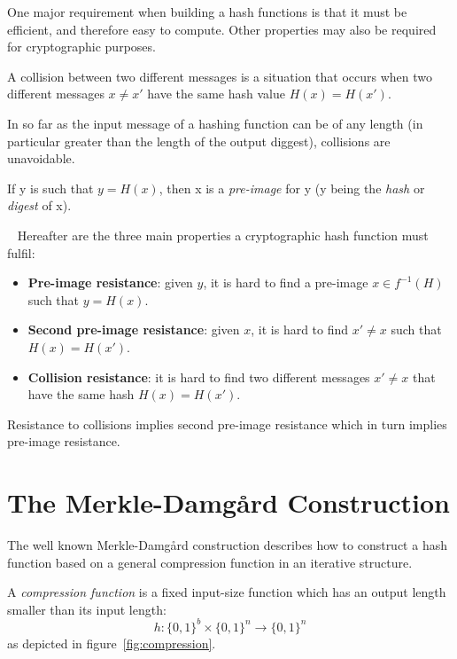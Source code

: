 One major requirement when building a hash functions is that it must be efficient, and therefore easy to compute. 
Other properties may also be required for cryptographic purposes.

\begin{defn}A collision between two different messages is a situation that occurs when two different messages $x \ne x'$ have the same hash value $H(x) = H(x')$.
\end{defn}
\begin{rem}
In so far as the input message of a hashing function can be of any length (in particular greater than the length of the output diggest), collisions are unavoidable.
\end{rem}
\begin{defn}
If y is such that $y = H(x)$, then x is a \emph{pre-image} for y (y being the \emph{hash} or \emph{digest}  of x).
\end{defn}

\begin{defn}~\label{def:sec_prop}
Hereafter are the three main properties a cryptographic hash function must fulfil:
\begin{itemize}
\item \textbf{Pre-image resistance}:  given $y$, it is hard to find a pre-image $x \in f^{-1}(H)$ such that $y = H(x)$.
\item \textbf{Second pre-image resistance}: given $x$, it is hard to find $x' \ne x$ such that $H(x) = H(x')$.
\item \textbf{Collision resistance}: it is hard to find two different messages $x' \ne x$ that have the same hash $H(x) = H(x')$.
\end{itemize}
\end{defn}

\begin{prop}Resistance to collisions implies second pre-image resistance which in turn implies pre-image resistance.
\end{prop}


\section{The Merkle-Damg\r{a}rd Construction}\label{sec:MerkleDamg}

The well known Merkle-Damg\r{a}rd construction describes how to construct a hash function based on a general compression function in an iterative structure. 

\begin{defn}A \emph{compression function} is a fixed input-size function which has an output length smaller than its input length: 
$$h:{\{0,1\}}^b ×{\{0,1\}}^n \rightarrow {\{0,1\}}^n$$
as depicted in figure~\ref{fig:compression}.
\end{defn}

